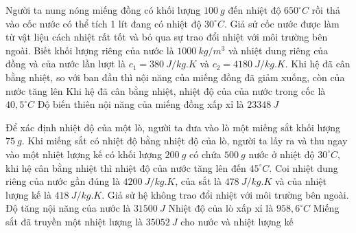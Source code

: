 \begin{ex} 
	Người ta nung nóng miếng đồng có khối lượng $100 \ g$ đến nhiệt độ $650^\circ C$ rồi thả vào cốc nước có thể tích 1 lít đang có nhiệt độ $30^\circ C$. Giả sử cốc nước được làm từ vật liệu cách nhiệt rất tốt và bỏ qua sự trao đổi nhiệt với môi trường bên ngoài. Biết khối lượng riêng của nước là $1000 \ kg / m^3$ và nhiệt dung riêng của đồng và của nước lần lượt là $c_1=380 \ J/kg.K$ và $c_2=4180 \ J/kg.K$.
	{\True Khi hệ đã cân bằng nhiệt, so với ban đầu thì nội năng của miếng đồng đã giảm xuống, còn của nước tăng lên}
	{Khi hệ đã cân bằng nhiệt, nhiệt độ của của nước trong cốc là $40,5^\circ C$}
	{Độ biến thiên nội năng của miếng đồng xấp xỉ là $23348 \ J$}
\end{ex}

\begin{ex} 
	Để xác định nhiệt độ của một lò, người ta đưa vào lò một miếng sắt khối lượng $75 \ g$. Khi miếng sắt có nhiệt độ bằng nhiệt độ của lò, người ta lấy ra và thu ngay vào một nhiệt lượng kế có khối lượng $200 \ g$ có chứa $500 \ g$ nước ở nhiệt độ $30^\circ C$, khi hệ cân bằng nhiệt thì nhiệt độ của nước tăng lên đến $45^\circ C$. Coi nhiệt dung riêng của nước gần đúng là $4200 \ J/kg.K$, của sắt là $478 \ J/kg.K$ và của nhiệt lượng kế là $418 \ J/kg.K$. Giả sử hệ không trao đổi nhiệt với môi trường bên ngoài.
	{\True Độ tăng nội năng của nước là $31500 \ J$}
	{\True Nhiệt độ của lò xấp xỉ là $958,6^\circ C$}
	{Miếng sắt đã truyền một nhiệt lượng là $35052 \ J$ cho nước và nhiệt lượng kế}
\end{ex}









